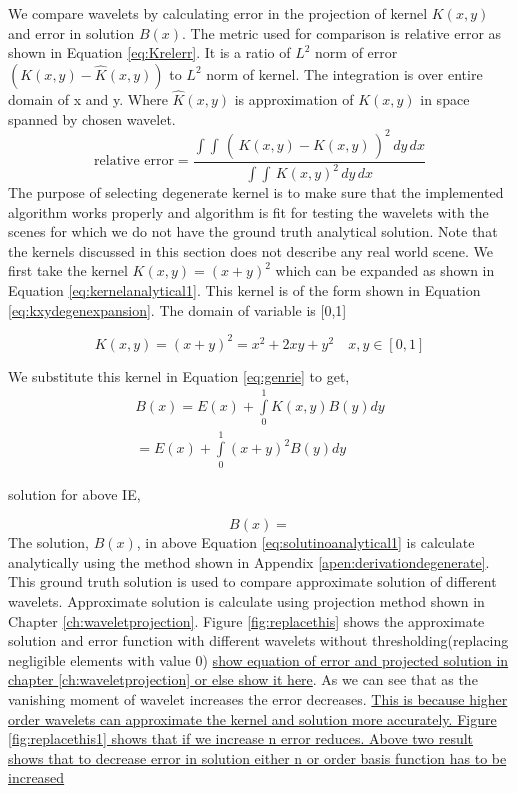 We compare wavelets by calculating error in the projection of kernel $K(x,y)$ and error in solution $B(x)$. The metric used for comparison is relative error as shown in Equation \ref{eq:Krelerr}. It is a ratio of $L^2$ norm of error $(K(x,y)-\hat{K}(x,y))$ to $L^2$ norm of kernel. The integration is over entire domain of x and y. Where $\hat{K}(x,y)$ is approximation of $K(x,y)$ in space spanned by chosen wavelet.
\begin{equation} \label{eq:Krelerr}
\text{relative  error}=\frac{\int\int \,(\,K(x,y)-\hat{K}(x,y)\,)^2  \,dy \, dx}{\int\int \,K(x,y)^2  \,dy \, dx}
\end{equation}
The purpose of selecting degenerate kernel is to make sure that the implemented algorithm works properly and algorithm is fit for testing the wavelets with the scenes for which we do not have the ground truth analytical solution. Note that the kernels discussed in this section does not describe any real world scene. We first take the kernel $K(x,y)=(x+y)^2$ which can be expanded as shown in Equation \ref{eq:kernelanalytical1}. This kernel is of the form shown in Equation \ref{eq:kxydegenexpansion}. The domain of variable is [0,1]




\begin{equation} \label{eq:kernelanalytical1}
K(x,y)=(x+y)^2=x^2+2xy+y^2 \quad x,y \in [0,1]
\end{equation}



We substitute this kernel in Equation \ref{eq:genrie} to get,
\begin{eqnarray} \label{eq:analytical1}
B(x)=E(x)+\int\limits_0^1 K(x,y)B(y) dy \\
 = E(x)+\int\limits_0^1 (x+y)^2 B(y) dy
\end{eqnarray}

solution for above IE,

\begin{equation} \label{eq:solutinoanalytical1}
B(x)=
\end{equation}
The solution, $B(x)$, in above Equation \ref{eq:solutinoanalytical1} is calculate analytically using the method shown in Appendix \ref{apen:derivationdegenerate}. This ground truth solution is used to compare approximate solution of different wavelets. Approximate solution is calculate using projection method shown in Chapter \ref{ch:waveletprojection}. Figure \ref{fig:replacethis} shows the approximate solution and error function with different wavelets without thresholding(replacing negligible elements  with value 0) \underline {show equation of error and projected solution in chapter \ref{ch:waveletprojection} or else show it here}. As we can see that as the vanishing moment of wavelet increases the error decreases. \underline{ This is because higher order wavelets can approximate the kernel and solution more accurately. Figure \ref{fig:replacethis1}  shows that if we increase n error reduces. Above two result shows that to decrease error in  solution either n or order basis function has to be increased}



